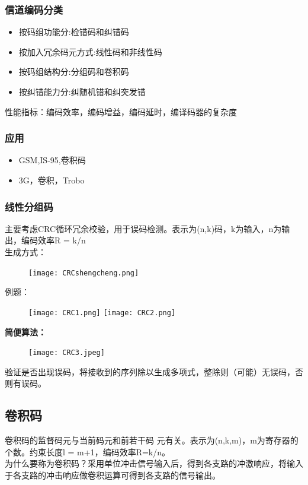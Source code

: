 \subsubsection{信道编码分类}
\begin{itemize}
	\item 按码组功能分:检错码和纠错码
	\item 按加入冗余码元方式:线性码和非线性码
	\item 按码组结构分:分组码和卷积码
	\item  按纠错能力分:纠随机错和纠突发错
	
\end{itemize}
性能指标：编码效率，编码增益，编码延时，编译码器的复杂度
\subsubsection{应用}
\begin{itemize}
	\item GSM,IS-95,卷积码
	\item 3G，卷积，Trobo
\end{itemize}
\subsubsection{线性分组码}
主要考虑CRC循环冗余校验，用于误码检测。表示为(n,k)码，k为输入，n为输出，编码效率R = k/n\\
生成方式：
\begin{figure}[H]
	\centering
	\texttt{[image: CRCshengcheng.png]}
	\caption{}
	\label{fig:crc}
\end{figure}
例题：
\begin{figure}[H]
	\centering
	\texttt{[image: CRC1.png]}	\texttt{[image: CRC2.png]}
	\caption{}
	\label{fig:crc1}
\end{figure}
\textbf{简便算法：}
\begin{figure}[H]
	\centering
	\texttt{[image: CRC3.jpeg]}
\end{figure}
验证是否出现误码，将接收到的序列除以生成多项式，整除则（可能）无误码，否则有误码。
\subsection{卷积码}
卷积码的监督码元与当前码元和前若干码
元有关。表示为(n,k,m)，m为寄存器的个数。约束长度l = m+1，编码效率R=k/n。\\
为什么要称为卷积码？采用单位冲击信号输入后，得到各支路的冲激响应，将输入于各支路的冲击响应做卷积运算可得到各支路的信号输出。

